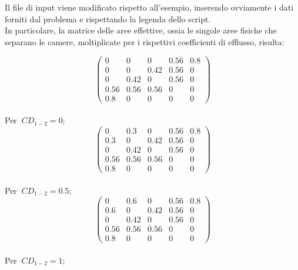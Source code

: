 \documentclass{article}
\begin{document}
        Il file di input viene modificato rispetto all'esempio, 
        inserendo ovviamente i dati forniti dal problema e rispettando la legenda
        dello script.\\ 
        In particolare, la matrice delle aree effettive, ossia le singole aree fisiche che separano le camere, moltiplicate
        per i rispettivi coefficienti di efflusso, risulta: \\
        \begin{center}  
            \[
            \begin{pmatrix}
                0    & 0    & 0        & 0.56 & 0.8\\ 
                0    & 0    & 0.42     & 0.56 & 0\\ 
                0    & 0.42 & 0        & 0.56 & 0\\ 
                0.56 & 0.56 & 0.56     & 0    & 0\\
                0.8  & 0    & 0        & 0    & 0 
            \end{pmatrix}
            \]
            \\ 
            Per $\ CD_{1-2} = 0;$ \
            \\ 
            \[
            \begin{pmatrix}
                0    & 0.3  & 0        & 0.56 & 0.8\\ 
                0.3  & 0    & 0.42     & 0.56 & 0\\ 
                0    & 0.42 & 0        & 0.56 & 0\\ 
                0.56 & 0.56 & 0.56     & 0    & 0\\
                0.8  & 0    & 0        & 0    & 0 
            \end{pmatrix}
            \]
            \\ 
            Per $\ CD_{1-2} = 0.5;$ \
            \\ 
            \[
            \begin{pmatrix}
                0    & 0.6  & 0        & 0.56 & 0.8\\ 
                0.6  & 0    & 0.42     & 0.56 & 0\\ 
                0    & 0.42 & 0        & 0.56 & 0\\ 
                0.56 & 0.56 & 0.56     & 0    & 0\\
                0.8  & 0    & 0        & 0    & 0 
            \end{pmatrix}
            \]
            \\ 
            Per $\ CD_{1-2} = 1;$ \
        \end{center}    
        \clearpage
\end{document}
